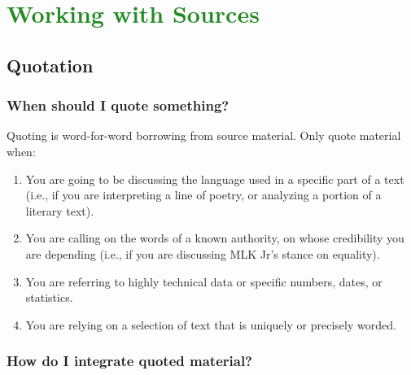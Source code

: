 

\section{\textcolor{ForestGreen}{Working with Sources}}
\subsection{Quotation}
 
\subsubsection{When should I quote something?}

Quoting is word-for-word borrowing from source material. Only quote material when:
 
\begin{enumerate}

\item You are going to be discussing the language used in a specific part of a text (i.e., if you are interpreting a line of poetry, or analyzing a portion of a literary text).
 
\item You are calling on the words of a known authority, on whose credibility you are depending (i.e., if you are discussing MLK Jr's stance on equality).
 
\item You are referring to highly technical data or specific numbers, dates, or statistics.
 
\item You are relying on a selection of text that is uniquely or precisely worded.
 
 \end{enumerate}
 
\subsubsection{How do I integrate quoted material?}
 
